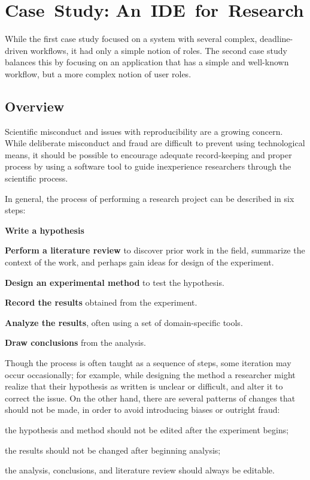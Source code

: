 \chapter{Case~Study: An~IDE~for~Research}

While the first case study focused on a system with several complex, deadline-driven workflows, it had only a simple notion of roles. The second case study balances this by focusing on an application that has a simple and well-known workflow, but a more complex notion of user roles.

\section {Overview}
\label{sec:case-study-research-overview}

Scientific misconduct and issues with reproducibility are a growing concern.
While deliberate misconduct and fraud are difficult to prevent using technological means, it should be possible to encourage adequate record-keeping and proper process by using a software tool to guide inexperience researchers through the scientific process.

In general, the process of performing a research project can be described in six steps:
\begin{compactenum}
\item \textbf{Write a hypothesis}
\item \textbf{Perform a literature review} to discover prior work in the field, summarize the context of the work, and perhaps gain ideas for design of the experiment.
\item \textbf{Design an experimental method} to test the hypothesis.
\item \textbf{Record the results} obtained from the experiment.
\item \textbf{Analyze the results}, often using a set of domain-specific tools.
\item \textbf{Draw conclusions} from the analysis.
\end{compactenum}

Though the process is often taught as a sequence of steps, some iteration may occur occasionally; for example, while designing the method a researcher might realize that their hypothesis as written is unclear or difficult, and alter it to correct the issue. On the other hand, there are several patterns of changes that should not be made, in order to avoid introducing biases or outright fraud:
\begin{compactitem}
\item the hypothesis and method should not be edited after the experiment begins;
\item the results should not be changed after beginning analysis;
\item the analysis, conclusions, and literature review should always be editable.
\end{compactitem}

